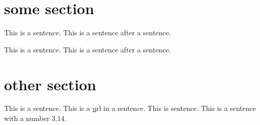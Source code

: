 

\section{some section}
\begin{something}
    This is a sentence.
    This is a sentence after a sentence. %
    \begin{else}
        This is a sentence.
        This is a sentence after a sentence. %
    \end{else}
\end{something}

\section{other section}
\begin{some stuff}
    This is a sentence.
    This is a \href{https://url.se} url {in} a sentence.
    This is sentence.
    This is a sentence with a number 3.14. %
\end{some stuff}
